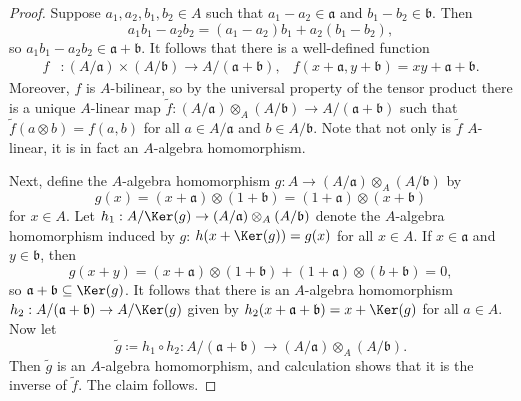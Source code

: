 \begin{proof}
Suppose \(a_1, a_2, b_1, b_2 \in A\) such that \(a_1 - a_2 \in \mathfrak{a}\) and \(b_1 - b_2 \in \mathfrak{b}\).
Then
\begin{equation*}
a_1 b_1 - a_2 b_2
= (a_1 - a_2) b_1 + a_2 (b_1 - b_2),
\end{equation*}
so \(a_1 b_1 - a_2 b_2 \in \mathfrak{a} + \mathfrak{b}\).
It follows that there is a well-defined function
\begin{align*}
f &: (A / \mathfrak{a}) \times (A / \mathfrak{b}) \to A / (\mathfrak{a} + \mathfrak{b}), &
f(x + \mathfrak{a}, y + \mathfrak{b}) = x y + \mathfrak{a} + \mathfrak{b}.
\end{align*}
Moreover, \(f\) is \(A\)-bilinear, so by the universal property of the tensor product there is a unique \(A\)-linear map \(\tilde{f} : (A / \mathfrak{a}) \otimes_A (A / \mathfrak{b}) \to A / (\mathfrak{a} + \mathfrak{b})\) such that \(\tilde{f}(a \otimes b) = f(a, b)\) for all \(a \in A / \mathfrak{a}\) and \(b \in A / \mathfrak{b}\).
Note that not only is \(\tilde{f}\) \(A\)-linear, it is in fact an \(A\)-algebra homomorphism.

Next, define the \(A\)-algebra homomorphism \(g : A \to (A / \mathfrak{a}) \otimes_A (A / \mathfrak{b})\) by
\begin{equation*}
g(x)
= (x + \mathfrak{a}) \otimes (1 + \mathfrak{b})
= (1 + \mathfrak{a}) \otimes (x + \mathfrak{b})
\end{equation*}
for \(x \in A\).
Let \(h_1 : A / \Ker(g) \to (A / \mathfrak{a}) \otimes_A (A / \mathfrak{b})\) denote the \(A\)-algebra homomorphism induced by \(g\): \(h(x + \Ker(g)) = g(x)\) for all \(x \in A\).
If \(x \in \mathfrak{a}\) and \(y \in \mathfrak{b}\), then
\begin{equation*}
g(x + y) = (x + \mathfrak{a}) \otimes (1 + \mathfrak{b}) + (1 + \mathfrak{a}) \otimes (b + \mathfrak{b}) = 0,
\end{equation*}
so \(\mathfrak{a} + \mathfrak{b} \subseteq \Ker(g)\).
It follows that there is an \(A\)-algebra homomorphism \(h_2 : A / (\mathfrak{a} + \mathfrak{b}) \to A / \Ker(g)\) given by \(h_2(x + \mathfrak{a} + \mathfrak{b}) = x + \Ker(g)\) for all \(a \in A\).
Now let
\begin{equation*}
\tilde{g} \coloneqq h_1 \circ h_2 : A / (\mathfrak{a} + \mathfrak{b}) \to (A / \mathfrak{a}) \otimes_A (A / \mathfrak{b}).
\end{equation*}
Then \(\tilde{g}\) is an \(A\)-algebra homomorphism, and calculation shows that it is the inverse of \(\tilde{f}\).
The claim follows.
\end{proof}